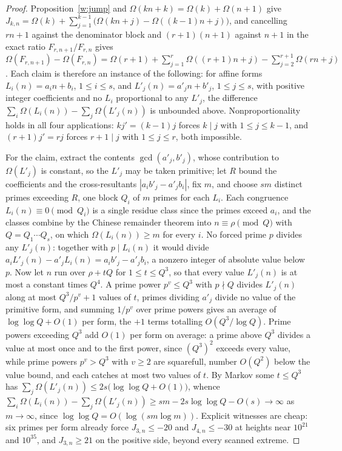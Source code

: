 \documentclass[11pt]{article}
\theoremstyle{definition}
\begin{document}
\begin{proof}
Proposition~\ref{w:jump} and $\Omega(kn+k)=\Omega(k)+\Omega(n+1)$ give $J_{k,n}=\Omega(k)+\sum_{j=1}^{k-1}\bigl(\Omega(kn+j)-\Omega((k-1)n+j)\bigr)$, and cancelling $rn+1$ against the denominator block and $(r+1)(n+1)$ against $n+1$ in the exact ratio $F_{r,n+1}/F_{r,n}$ gives $\Omega(F_{r,n+1})-\Omega(F_{r,n})=\Omega(r+1)+\sum_{j=1}^{r}\Omega((r+1)n+j)-\sum_{j=2}^{r+1}\Omega(rn+j)$.  Each claim is therefore an instance of the following: for affine forms $L_i(n)=a_in+b_i$, $1\le i\le s$, and $L'_j(n)=a'_jn+b'_j$, $1\le j\le s$, with positive integer coefficients and no $L_i$ proportional to any $L'_j$, the difference $\sum_i\Omega(L_i(n))-\sum_j\Omega(L'_j(n))$ is unbounded above.  Nonproportionality holds in all four applications: $kj'=(k-1)j$ forces $k\mid j$ with $1\le j\le k-1$, and $(r+1)j'=rj$ forces $r+1\mid j$ with $1\le j\le r$, both impossible.

For the claim, extract the contents $\gcd(a'_j,b'_j)$, whose contribution to $\Omega(L'_j)$ is constant, so the $L'_j$ may be taken primitive; let $R$ bound the coefficients and the cross-resultants $|a_ib'_j-a'_jb_i|$, fix $m$, and choose $sm$ distinct primes exceeding $R$, one block $Q_i$ of $m$ primes for each $L_i$.  Each congruence $L_i(n)\equiv0\pmod{Q_i}$ is a single residue class since the primes exceed $a_i$, and the classes combine by the Chinese remainder theorem into $n\equiv\rho\pmod Q$ with $Q=Q_1\cdots Q_s$, on which $\Omega(L_i(n))\ge m$ for every $i$.  No forced prime $p$ divides any $L'_j(n)$: together with $p\mid L_i(n)$ it would divide $a_iL'_j(n)-a'_jL_i(n)=a_ib'_j-a'_jb_i$, a nonzero integer of absolute value below $p$.  Now let $n$ run over $\rho+tQ$ for $1\le t\le Q^3$, so that every value $L'_j(n)$ is at most a constant times $Q^4$.  A prime power $p^v\le Q^3$ with $p\nmid Q$ divides $L'_j(n)$ along at most $Q^3/p^v+1$ values of $t$, primes dividing $a'_j$ divide no value of the primitive form, and summing $1/p^v$ over prime powers gives an average of $\log\log Q+O(1)$ per form, the $+1$ terms totalling $O(Q^3/\log Q)$.  Prime powers exceeding $Q^3$ add $O(1)$ per form on average: a prime above $Q^3$ divides a value at most once and to the first power, since $(Q^3)^2$ exceeds every value, while prime powers $p^v>Q^3$ with $v\ge2$ are squarefull, number $O(Q^2)$ below the value bound, and each catches at most two values of $t$.  By Markov some $t\le Q^3$ has $\sum_j\Omega(L'_j(n))\le2s\bigl(\log\log Q+O(1)\bigr)$, whence $\sum_i\Omega(L_i(n))-\sum_j\Omega(L'_j(n))\ge sm-2s\log\log Q-O(s)\to\infty$ as $m\to\infty$, since $\log\log Q=O(\log(sm\log m))$.  Explicit witnesses are cheap: six primes per form already force $J_{3,n}\le-20$ and $J_{4,n}\le-30$ at heights near $10^{21}$ and $10^{35}$, and $J_{3,n}\ge21$ on the positive side, beyond every scanned extreme.
\end{proof}
\end{document}
